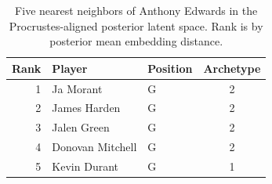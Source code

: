 \begin{table}[htbp]
  \centering\small
  \begin{tabular}{rllc}
    \toprule
    Rank & Player & Position & Archetype \\
    \midrule
    1 & Ja Morant & G & 2 \\
    2 & James Harden & G & 2 \\
    3 & Jalen Green & G & 2 \\
    4 & Donovan Mitchell & G & 2 \\
    5 & Kevin Durant & G & 1 \\
    \bottomrule
  \end{tabular}
  \caption{Five nearest neighbors of Anthony Edwards in the Procrustes-aligned posterior latent space. Rank is by posterior mean embedding distance.}
  \label{tab:Anthony_Edwards_neighbors}
\end{table}

